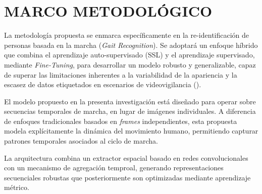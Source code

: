 \chapter{MARCO METODOLÓGICO}


La metodología propuesta se enmarca específicamente en la re-identificación de personas basada en la marcha (\textit{Gait Recognition}). Se adoptará un enfoque híbrido que combina el aprendizaje auto-supervisado (SSL) y el aprendizaje supervisado, mediante \textit{Fine-Tuning}, para desarrollar un modelo robusto y generalizable, capaz de superar las limitaciones inherentes a la variabilidad de la apariencia y la escasez de datos etiquetados en escenarios de videovigilancia (\cite{Huang2025PersonViT, Lee2023GaitParse}).

El modelo propuesto en la presenta investigación está diseñado para operar sobre secuencias temporales de marcha, en lugar de imágenes individuales. A diferencia de enfoques tradicionales basados en \textit{frames} independientes, esta propuesta modela explícitamente la dinámica del movimiento humano, permitiendo capturar patrones temporales asociados al ciclo de marcha. 

La arquitectura combina un extractor espacial basado en redes convolucionales con un mecanismo de agregación temproal, generando representaciones secuenciales robustas que posteriormente son optimizadas mediante aprendizaje métrico. 

